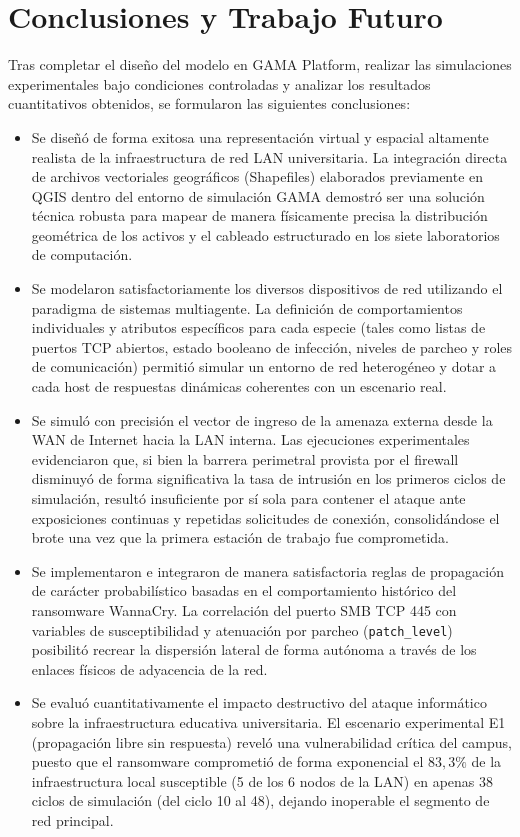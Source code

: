 \section{Conclusiones y Trabajo Futuro}
\label{sec:conclusiones}
Tras completar el diseño del modelo en GAMA Platform, realizar las simulaciones experimentales bajo condiciones controladas y analizar los resultados cuantitativos obtenidos, se formularon las siguientes conclusiones:

\begin{itemize}
    \item Se diseñó de forma exitosa una representación virtual y espacial altamente realista de la infraestructura de red LAN universitaria. La integración directa de archivos vectoriales geográficos (Shapefiles) elaborados previamente en QGIS dentro del entorno de simulación GAMA demostró ser una solución técnica robusta para mapear de manera físicamente precisa la distribución geométrica de los activos y el cableado estructurado en los siete laboratorios de computación.
    \item Se modelaron satisfactoriamente los diversos dispositivos de red utilizando el paradigma de sistemas multiagente. La definición de comportamientos individuales y atributos específicos para cada especie (tales como listas de puertos TCP abiertos, estado booleano de infección, niveles de parcheo y roles de comunicación) permitió simular un entorno de red heterogéneo y dotar a cada host de respuestas dinámicas coherentes con un escenario real.
    \item Se simuló con precisión el vector de ingreso de la amenaza externa desde la WAN de Internet hacia la LAN interna. Las ejecuciones experimentales evidenciaron que, si bien la barrera perimetral provista por el firewall disminuyó de forma significativa la tasa de intrusión en los primeros ciclos de simulación, resultó insuficiente por sí sola para contener el ataque ante exposiciones continuas y repetidas solicitudes de conexión, consolidándose el brote una vez que la primera estación de trabajo fue comprometida.
    \item Se implementaron e integraron de manera satisfactoria reglas de propagación de carácter probabilístico basadas en el comportamiento histórico del ransomware WannaCry. La correlación del puerto SMB TCP 445 con variables de susceptibilidad y atenuación por parcheo (\texttt{patch\_}\allowbreak\texttt{level}) posibilitó recrear la dispersión lateral de forma autónoma a través de los enlaces físicos de adyacencia de la red.
    \item Se evaluó cuantitativamente el impacto destructivo del ataque informático sobre la infraestructura educativa universitaria. El escenario experimental E1 (propagación libre sin respuesta) reveló una vulnerabilidad crítica del campus, puesto que el ransomware comprometió de forma exponencial el $83,3\%$ de la infraestructura local susceptible (5 de los 6 nodos de la LAN) en apenas 38 ciclos de simulación (del ciclo 10 al 48), dejando inoperable el segmento de red principal.

\end{itemize}
